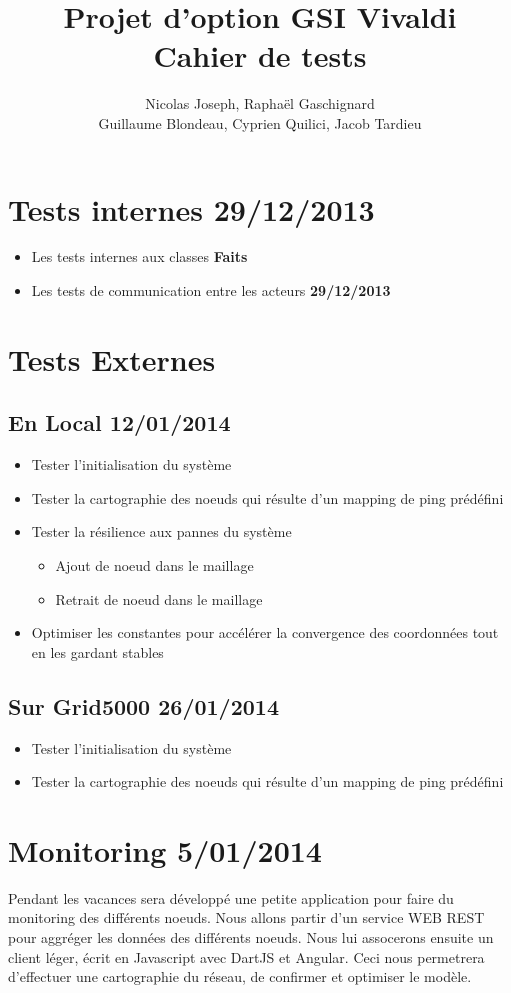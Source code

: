 \documentclass[11pt,a4paper]{article}
\title{Projet d'option GSI Vivaldi \\ Cahier de tests}
\author{Nicolas Joseph, Raphaël Gaschignard\\ Guillaume Blondeau, Cyprien Quilici, Jacob Tardieu}
\begin{document}
\maketitle

\section{Tests internes \hfill 29/12/2013}
\begin{itemize}
\item Les tests internes aux classes  \hfill \textbf{Faits}
\item Les tests de communication entre les acteurs \hfill \textbf{29/12/2013}
\end{itemize}

\section{Tests Externes}
\subsection{En Local \hfill \textbf{12/01/2014}}

\begin{itemize}
\item Tester l’initialisation du système
\item Tester la cartographie des noeuds qui résulte d’un mapping de ping prédéfini
\item Tester la résilience aux pannes du système
\begin{itemize}
\item Ajout de noeud dans le maillage
\item Retrait de noeud dans le maillage
\end{itemize}
\item Optimiser les constantes pour accélérer la convergence des coordonnées tout en les gardant stables
\end{itemize}

\subsection{Sur Grid5000  \hfill \textbf{26/01/2014}}
\begin{itemize}
\item Tester l’initialisation du système
\item Tester la cartographie des noeuds qui résulte d’un mapping de ping prédéfini
\end{itemize}

\section{Monitoring \hfill 5/01/2014}
Pendant les vacances sera développé une petite application pour faire du monitoring des différents noeuds. Nous allons partir d'un service WEB REST pour aggréger les données des différents noeuds. Nous lui assocerons ensuite un client léger, écrit en Javascript avec DartJS et Angular. Ceci nous permetrera d'effectuer une cartographie du réseau, de confirmer et optimiser le modèle.
\end{document}
